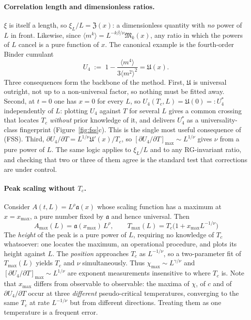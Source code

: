 \documentclass[10pt,a4paper]{article}
\theoremstyle{remark}
\begin{document}
\paragraph{Correlation length and dimensionless ratios.} $\xi$ is itself a
length, so $\xi_L/L=\mathfrak{Z}(x)$: a dimensionless quantity with \emph{no}
power of $L$ in front. Likewise, since $\langle
m^{k}\rangle=L^{-k\beta/\nu}\mathfrak{M}_k(x)$, any ratio in which the powers of
$L$ cancel is a pure function of $x$. The canonical example is the fourth-order
Binder cumulant
\[
U_4\;:=\;1-\frac{\langle m^{4}\rangle}{3\langle m^{2}\rangle^{2}}
=\mathfrak{U}(x) .
\]
Three consequences form the backbone of the method. First, $\mathfrak{U}$ is
universal outright, not up to a non-universal factor, so nothing must be fitted
away. Second, at $t=0$ one has $x=0$ for every $L$, so
$U_4(T_c,L)=\mathfrak{U}(0)=:U_4^{\ast}$ independently of $L$: plotting
$U_4$ against $T$ for several $L$ gives a common crossing that locates $T_c$
\emph{without} prior knowledge of it, and delivers $U_4^{\ast}$ as a
universality-class fingerprint (Figure~\ref{fig:fss}c). This is the single most
useful consequence of (FSS). Third, $\partial U_4/\partial
T=L^{1/\nu}\mathfrak{U}'(x)/T_c$, so $[\partial U_4/\partial T]_{\max}\sim
L^{1/\nu}$ gives $\nu$ from a pure power of $L$. The same logic applies to
$\xi_L/L$ and to any RG-invariant ratio, and checking that two or three of them
agree is the standard test that corrections are under control.

\paragraph{Peak scaling without $T_c$.} Consider $A(t,L)=L^{\rho}\mathfrak{a}(x)$
whose scaling function has a maximum at $x=x_{\max}$, a pure number fixed by
$\mathfrak{a}$ and hence universal. Then
\[
\;
A_{\max}(L)=\mathfrak{a}(x_{\max})\,L^{\rho},
\qquad
T_{\max}(L)=T_c\Big(1+x_{\max}L^{-1/\nu}\Big)
\
\]
The \emph{height} of the peak is a pure power of $L$, requiring no knowledge of
$T_c$ whatsoever: one locates the maximum, an operational procedure, and plots
its height against $L$. The \emph{position} approaches $T_c$ as $L^{-1/\nu}$, so
a two-parameter fit of $T_{\max}(L)$ yields $T_c$ and $\nu$ simultaneously. Thus
$\chi_{\max}\sim L^{\gamma/\nu}$ and $[\partial U_4/\partial T]_{\max}\sim
L^{1/\nu}$ are exponent measurements insensitive to where $T_c$ is. Note that
$x_{\max}$ differs from observable to observable: the maxima of $\chi$, of $c$
and of $\partial U_4/\partial T$ occur at three \emph{different} pseudo-critical
temperatures, converging to the same $T_c$ at rate $L^{-1/\nu}$ but from
different directions. Treating them as one temperature is a frequent error.
\end{document}
